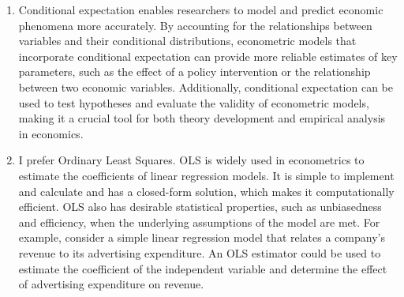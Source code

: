 \documentclass[12pt]{article}
\begin{document}
\begin{enumerate}
    \item Conditional expectation enables researchers to model and predict economic phenomena more accurately. By accounting for the relationships between variables and their conditional distributions, econometric models that incorporate conditional expectation can provide more reliable estimates of key parameters, such as the effect of a policy intervention or the relationship between two economic variables. Additionally, conditional expectation can be used to test hypotheses and evaluate the validity of econometric models, making it a crucial tool for both theory development and empirical analysis in economics.
    \item I prefer Ordinary Least Squares. OLS is widely used in econometrics to estimate the coefficients of linear regression models. It is simple to implement and calculate and has a closed-form solution, which makes it computationally efficient. OLS also has desirable statistical properties, such as unbiasedness and efficiency, when the underlying assumptions of the model are met. For example, consider a simple linear regression model that relates a company's revenue to its advertising expenditure. An OLS estimator could be used to estimate the coefficient of the independent variable and determine the effect of advertising expenditure on revenue.
\end{enumerate}
\end{document}
